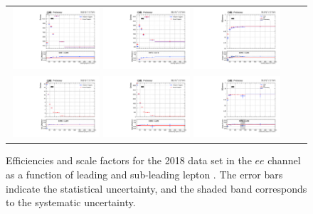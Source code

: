 \begin{figure}[h]
  \begin{center}
    \begin{tabular}{ccc}
      \includegraphics[width=0.32\textwidth]{fig_2018_TrigSF/g_lepApt_ee_MC.pdf}
      \includegraphics[width=0.32\textwidth]{fig_2018_TrigSF/g_lepApt_ee_data.pdf}
      \includegraphics[width=0.32\textwidth]{fig_2018_TrigSF/g_ee_lepApt_FullSystUncBand.pdf}\\
      \includegraphics[width=0.32\textwidth]{fig_2018_TrigSF/g_lepBpt_ee_MC.pdf}
      \includegraphics[width=0.32\textwidth]{fig_2018_TrigSF/g_lepBpt_ee_data.pdf}
      \includegraphics[width=0.32\textwidth]{fig_2018_TrigSF/g_ee_lepBpt_FullSystUncBand.pdf}\\
    \end{tabular}
    \caption{Efficiencies and scale factors for the 2018 data set in the $ee$ channel as a function of leading and sub-leading lepton \pT.
            The error bars indicate the statistical uncertainty, and the shaded band corresponds to the systematic uncertainty.
            }
    \label{TrigSF_2018_2}
  \end{center}
\end{figure}

